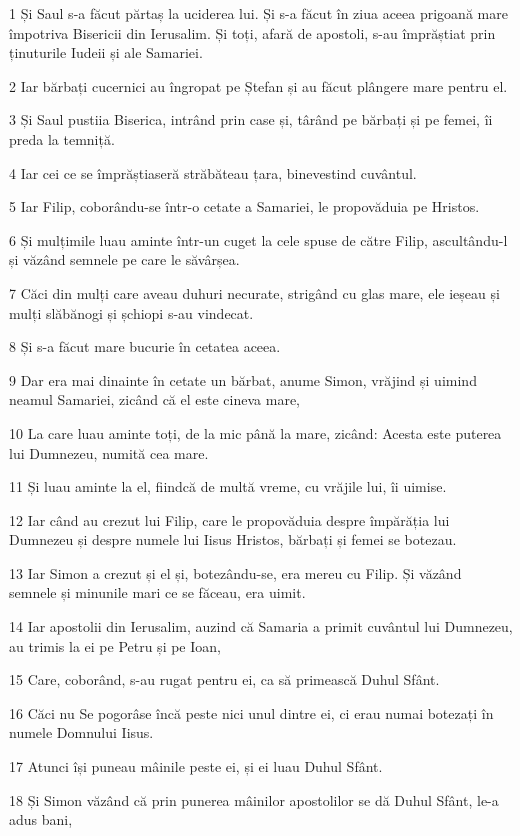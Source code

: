 \par 1 Și Saul s-a făcut părtaș la uciderea lui. Și s-a făcut în ziua aceea prigoană mare împotriva Bisericii din Ierusalim. Și toți, afară de apostoli, s-au împrăștiat prin ținuturile Iudeii și ale Samariei.
\par 2 Iar bărbați cucernici au îngropat pe Ștefan și au făcut plângere mare pentru el.
\par 3 Și Saul pustiia Biserica, intrând prin case și, târând pe bărbați și pe femei, îi preda la temniță.
\par 4 Iar cei ce se împrăștiaseră străbăteau țara, binevestind cuvântul.
\par 5 Iar Filip, coborându-se într-o cetate a Samariei, le propovăduia pe Hristos.
\par 6 Și mulțimile luau aminte într-un cuget la cele spuse de către Filip, ascultându-l și văzând semnele pe care le săvârșea.
\par 7 Căci din mulți care aveau duhuri necurate, strigând cu glas mare, ele ieșeau și mulți slăbănogi și șchiopi s-au vindecat.
\par 8 Și s-a făcut mare bucurie în cetatea aceea.
\par 9 Dar era mai dinainte în cetate un bărbat, anume Simon, vrăjind și uimind neamul Samariei, zicând că el este cineva mare,
\par 10 La care luau aminte toți, de la mic până la mare, zicând: Acesta este puterea lui Dumnezeu, numită cea mare.
\par 11 Și luau aminte la el, fiindcă de multă vreme, cu vrăjile lui, îi uimise.
\par 12 Iar când au crezut lui Filip, care le propovăduia despre împărăția lui Dumnezeu și despre numele lui Iisus Hristos, bărbați și femei se botezau.
\par 13 Iar Simon a crezut și el și, botezându-se, era mereu cu Filip. Și văzând semnele și minunile mari ce se făceau, era uimit.
\par 14 Iar apostolii din Ierusalim, auzind că Samaria a primit cuvântul lui Dumnezeu, au trimis la ei pe Petru și pe Ioan,
\par 15 Care, coborând, s-au rugat pentru ei, ca să primească Duhul Sfânt.
\par 16 Căci nu Se pogorâse încă peste nici unul dintre ei, ci erau numai botezați în numele Domnului Iisus.
\par 17 Atunci își puneau mâinile peste ei, și ei luau Duhul Sfânt.
\par 18 Și Simon văzând că prin punerea mâinilor apostolilor se dă Duhul Sfânt, le-a adus bani,

